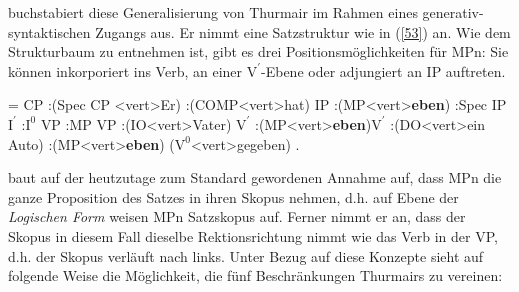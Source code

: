 \citet{Abraham1991a} buchstabiert diese Generalisierung von Thurmair im Rahmen eines generativ-syntaktischen Zugangs aus. Er nimmt eine Satzstruktur wie in (\ref{53}) an. Wie dem Strukturbaum zu entnehmen ist, gibt es drei Positions\-möglichkeiten für MPn: Sie können inkorporiert ins Verb, an einer $\textrm{V}^{\prime}$-Ebene oder adjungiert an IP auftreten.

\begin{exe}
	\ex\label{53}   
\begin{jtree}
\! = {CP}
:({Spec CP} <vert>{Er}) 
:({COMP}<vert>{hat}) {IP}
:({MP}<vert>{\textbf{eben}}) 
:{Spec IP} {$\textrm{I}^{\prime}$}
:{$\textrm{I}^{0}$} {VP}
:{MP} {VP}
:({IO}<vert>{Vater}) {$\textrm{V}^{\prime}$}
:({MP}<vert>{\textbf{eben}}){$\textrm{V}^{\prime}$}
:({DO}<vert>{ein Auto}) 
:({MP}<vert>{\textbf{eben}}) ({$\textrm{V}^{0}$}<vert>{gegeben})
.
\end{jtree}
\end{exe}
\citet{Abraham1991a} baut auf der heutzutage zum Standard gewordenen Annahme auf, dass MPn die ganze Proposition des Satzes in ihren Skopus nehmen, d.h. auf Ebene der \textit{Logischen Form}  weisen MPn Satzskopus  auf. Ferner nimmt er an, dass der Skopus in diesem Fall dieselbe Rektionsrichtung  nimmt wie das Verb in der VP, d.h. der Skopus verläuft nach links. Unter Bezug auf diese Konzepte sieht \citet[118]{Abraham1991a} auf folgende Weise die Möglichkeit, die fünf Beschränkungen Thurmairs zu vereinen:

